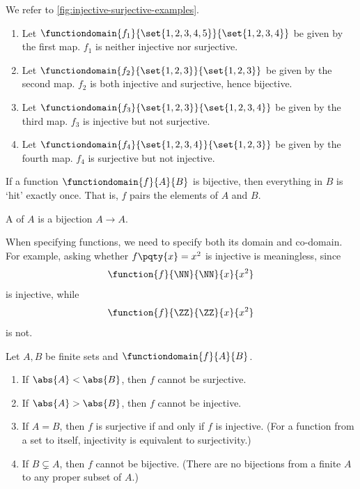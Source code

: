 \begin{examples}
    We refer to \autoref{fig:injective-surjective-examples}.

    \begin{enumerate}
        \item Let \(\functiondomain{f_1}{\set{1, 2, 3, 4, 5}}{\set{1, 2, 3, 4}}\) be given by the first map. \(f_1\) is neither injective nor surjective.

        \item Let \(\functiondomain{f_2}{\set{1, 2, 3}}{\set{1, 2, 3}}\) be given by the second map. \(f_2\) is both injective and surjective, hence bijective.

        \item Let \(\functiondomain{f_3}{\set{1, 2, 3}}{\set{1, 2, 3, 4}}\) be given by the third map. \(f_3\) is injective but not surjective.

        \item Let \(\functiondomain{f_4}{\set{1, 2, 3, 4}}{\set{1, 2, 3}}\) be given by the fourth map. \(f_4\) is surjective but not injective.
    \end{enumerate}
\end{examples}

If a function \(\functiondomain{f}{A}{B}\) is bijective, then everything in \(B\) is `hit' exactly once. That is, \(f\) pairs the elements of \(A\) and \(B\).

\begin{definition}[Permutation]
    A  of \(A\) is a bijection \(A \to A\).
\end{definition}

\begin{remark}
    When specifying functions, we need to specify both its domain and co-domain. For example, asking whether \(f\pqty{x} = x^2\) is injective is meaningless, since
    \[
        \function{f}{\NN}{\NN}{x}{x^2}
    \]
    is injective, while
    \[
        \function{f}{\ZZ}{\ZZ}{x}{x^2}
    \]
    is not.
\end{remark}

\begin{proposition}
    Let \(A, B\) be finite sets and \(\functiondomain{f}{A}{B}\).
    \begin{enumerate}
        \item If \(\abs{A} < \abs{B}\), then \(f\) cannot be surjective.
        \item If \(\abs{A} > \abs{B}\), then \(f\) cannot be injective.
        \item If \(A = B\), then \(f\) is surjective if and only if \(f\) is injective. (For a function from a set to itself, injectivity is equivalent to surjectivity.)
        \item If \(B \subsetneq A\), then \(f\) cannot be bijective. (There are no bijections from a finite \(A\) to any proper subset of \(A\).)
    \end{enumerate}
\end{proposition}

